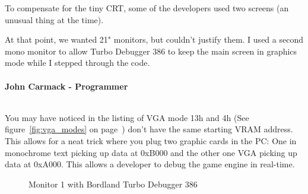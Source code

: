 \documentclass[book.tex]{subfiles}
\begin{document}
To compensate for the tiny CRT, some of the developers used two screens (an unusual thing at the time).\\

\begin{fancyquotes}
At that point, we wanted 21" monitors, but couldn't justify them.  I used a second mono monitor to allow Turbo Debugger 386 to keep the main screen in graphics mode while I stepped through the code.\\
 \\
\textbf{John Carmack - Programmer}
\end{fancyquotes}
\\
You may have noticed in the listing of VGA mode 13h and 4h (See figure~\ref{fig:vga_modes} on page~\pageref{fig:vga_modes})  don't have the same starting VRAM address. This allows for a neat trick where you plug two graphic cards in the PC: One in monochrome text picking up data at 0xB000 and the other one VGA picking up  data at 0xA000. This allows a developer to debug the game engine in real-time.\\
\begin{figure}[H]
\centering
\caption{Monitor 1 with Bordland Turbo Debugger 386}
\label{fig:dm1}
\end{figure}
\end{document}
